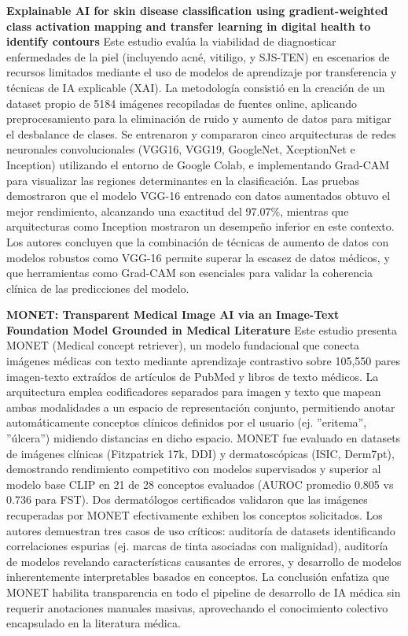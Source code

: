\documentclass[11pt, a4paper]{article}
\begin{document}
\textbf{Explainable AI for skin disease classification using gradient-weighted class activation mapping and transfer learning in digital health to identify contours} \cite{badhon_explainable_2025} 
Este estudio evalúa la viabilidad de diagnosticar enfermedades de la piel (incluyendo acné, vitiligo, y SJS-TEN) en escenarios de recursos limitados mediante el uso de modelos de aprendizaje por transferencia y técnicas de IA 
explicable (XAI). La metodología consistió en la creación de un dataset propio de 5184 imágenes recopiladas de fuentes online, aplicando preprocesamiento para la eliminación de ruido y aumento de datos para mitigar el desbalance de
clases. Se entrenaron y compararon cinco arquitecturas de redes neuronales convolucionales (VGG16, VGG19, GoogleNet, XceptionNet e Inception) utilizando el entorno de Google Colab, e implementando Grad-CAM para visualizar las 
regiones determinantes en la clasificación. Las pruebas demostraron que el modelo VGG-16 entrenado con datos aumentados obtuvo el mejor rendimiento, alcanzando una exactitud del 97.07\%, mientras que arquitecturas como Inception
mostraron un desempeño inferior en este contexto. Los autores concluyen que la combinación de técnicas de aumento de datos con modelos robustos como VGG-16 permite superar la escasez de datos médicos, y que herramientas como Grad-CAM
son esenciales para validar la coherencia clínica de las predicciones del modelo.

\textbf{MONET: Transparent Medical Image AI via an Image-Text Foundation Model Grounded in Medical Literature} \cite{kim_transparent_2024}
Este estudio presenta MONET (Medical concept retriever), un modelo fundacional que conecta imágenes médicas con texto mediante aprendizaje contrastivo sobre 105,550 pares imagen-texto extraídos de artículos de PubMed y libros de texto
médicos. La arquitectura emplea codificadores separados para imagen y texto que mapean ambas modalidades a un espacio de representación conjunto, permitiendo anotar automáticamente conceptos clínicos definidos por el usuario (ej. ''eritema'',
''úlcera'') midiendo distancias en dicho espacio. MONET fue evaluado en datasets de imágenes clínicas (Fitzpatrick 17k, DDI) y dermatoscópicas (ISIC, Derm7pt), demostrando rendimiento competitivo con modelos supervisados y superior al modelo
base CLIP en 21 de 28 conceptos evaluados (AUROC promedio 0.805 vs 0.736 para FST). Dos dermatólogos certificados validaron que las imágenes recuperadas por MONET efectivamente exhiben los conceptos solicitados. Los autores demuestran tres
casos de uso críticos: auditoría de datasets identificando correlaciones espurias (ej. marcas de tinta asociadas con malignidad), auditoría de modelos revelando características causantes de errores, y desarrollo de modelos inherentemente
interpretables basados en conceptos. La conclusión enfatiza que MONET habilita transparencia en todo el pipeline de desarrollo de IA médica sin requerir anotaciones manuales masivas, aprovechando el conocimiento colectivo encapsulado en la
literatura médica.
\end{document}

